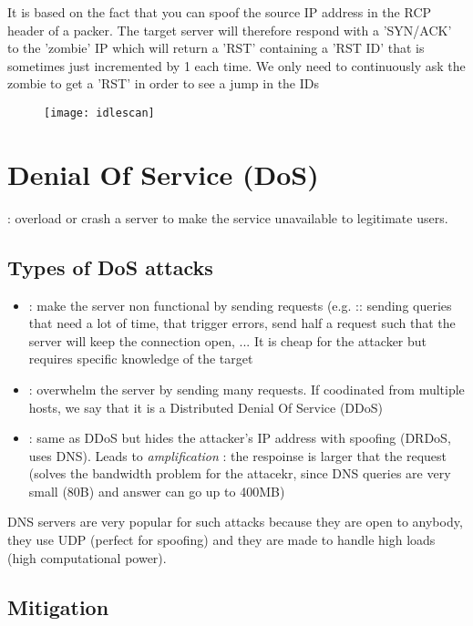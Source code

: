 It is based on the fact that you can spoof the source IP address in the RCP header of a packer. The target server will therefore respond with a 'SYN/ACK' to the 'zombie' IP which will return a 'RST' containing a 'RST ID' that is sometimes just incremented by 1 each time. We only need to continuously ask the zombie to get a 'RST' in order to see a jump in the IDs

\begin{figure}[H]
    \centering
    \texttt{[image: idlescan]}
\end{figure}

\chapter{Denial Of Service (DoS)}

 : overload or crash a server to make the service unavailable to legitimate users.

\section{Types of DoS attacks}

\begin{itemize}
    \item {} : make the server non functional by sending requests (e.g. :: sending queries that need a lot of time, that trigger errors, send half a request such that the server will keep the connection open, ... It is cheap for the attacker but requires specific knowledge of the target
    \item {} : overwhelm the server by sending many requests. If coodinated from multiple hosts, we say that it is a Distributed Denial Of Service (DDoS) 
    \item {} : same as DDoS but hides the attacker's IP address with spoofing (DRDoS, uses DNS). Leads to \textit{amplification} : the respoinse is larger that the request (solves the bandwidth problem for the attacekr, since DNS queries are very small (80B) and answer can go up to 400MB)
\end{itemize}

DNS servers are very popular for such attacks because they are open to anybody, they use UDP (perfect for spoofing) and they are made to handle high loads (high computational power).

\section{Mitigation}

